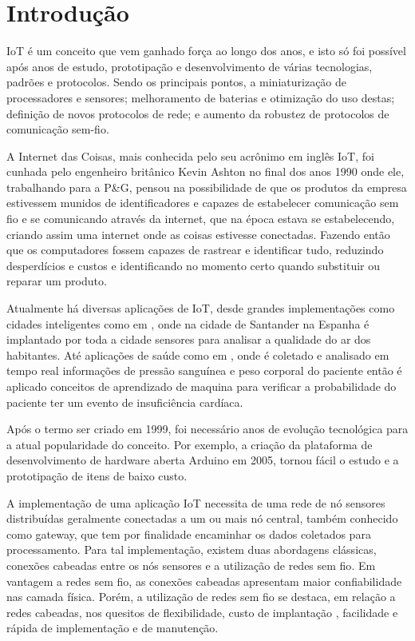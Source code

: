 \chapter[Introdução]{Introdução}
\label{cap:intro}

IoT é um conceito que vem ganhado força ao longo dos anos, e isto só foi possível após anos de estudo, prototipação e desenvolvimento de várias tecnologias, padrões e protocolos. Sendo os principais pontos, a miniaturização de processadores e sensores; melhoramento de baterias e otimização do uso destas; definição de novos protocolos de rede; e aumento da robustez de protocolos de comunicação sem-fio.

A Internet das Coisas, mais conhecida pelo seu acrônimo em inglês IoT, foi cunhada pelo engenheiro britânico Kevin Ashton no final dos anos 1990 onde ele, trabalhando para a P\&G, pensou na possibilidade de que os produtos da empresa estivessem munidos de identificadores e capazes de estabelecer comunicação sem fio e se comunicando através da internet, que na época estava se estabelecendo, criando assim uma internet onde as coisas estivesse conectadas\cite{KA_IOT}. Fazendo então que os computadores fossem capazes de rastrear e identificar tudo, reduzindo desperdícios e custos e identificando no momento certo quando substituir ou reparar um produto\cite{lopezIOT}.

Atualmente há diversas aplicações de IoT, desde grandes implementações como cidades inteligentes como em \cite{sotres2017practical}, onde na cidade de Santander na Espanha é implantado por toda a cidade sensores para analisar a qualidade do ar dos habitantes. Até aplicações de saúde como em \cite{zhang2015remote}, onde é coletado e analisado em tempo real informações de pressão sanguínea e peso corporal do paciente então é aplicado conceitos de aprendizado de maquina para verificar a probabilidade do paciente ter um evento de insuficiência cardíaca.

Após o termo ser criado em 1999, foi necessário anos de evolução tecnológica para a atual popularidade do conceito. Por exemplo, a criação da plataforma de desenvolvimento de hardware aberta Arduino em 2005\cite{OC_ARDUINO}, tornou fácil o estudo e a prototipação de itens de baixo custo. 

A implementação de uma aplicação IoT necessita de uma rede de nó sensores distribuídas geralmente conectadas a um ou mais nó central, também conhecido como gateway, que tem por finalidade encaminhar os dados coletados para processamento. Para tal implementação, existem duas abordagens clássicas, conexões cabeadas entre os nós sensores e a utilização de redes sem fio\cite{gomes2017estimaccao}. Em vantagem a redes sem fio, as conexões cabeadas apresentam maior confiabilidade nas camada física. Porém, a utilização de redes sem fio se destaca, em relação a redes cabeadas, nos quesitos de flexibilidade, custo de implantação , facilidade e rápida de implementação e de manutenção\cite{gungor2009industrial}.


